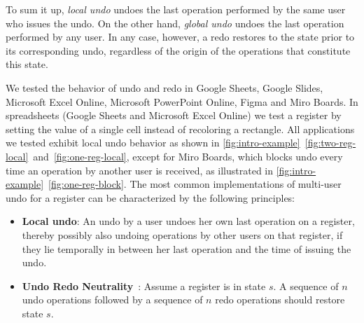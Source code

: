 \documentclass[sigplan,natbib=false,review]{acmart}
\begin{document}
To sum it up, \emph{local undo} undoes the last operation
performed by the same user who issues the undo.
On the other hand, \emph{global undo} undoes the last operation
performed by any user.
In any case, however, a redo restores to the state prior to its corresponding undo,
regardless of the origin of the operations that constitute this state.



We tested the behavior of undo and redo in Google Sheets, Google Slides,
Microsoft Excel Online, Microsoft PowerPoint Online, Figma and Miro Boards.
In spreadsheets (Google Sheets and Microsoft Excel Online)
we test a register by setting the value of a single cell instead of recoloring
a rectangle.
All applications we tested exhibit local undo behavior as shown in
\cref{fig:intro-example}~\ref{fig:two-reg-local}~and~\ref{fig:one-reg-local},
except for Miro Boards, which blocks undo every time an operation
by another user is received, as illustrated
in \cref{fig:intro-example}~\ref{fig:one-reg-block}.
The most common implementations of multi-user undo for a register
can be characterized by the following principles:

\begin{itemize}
  \item \textbf{Local undo}:
    An undo by a user undoes her own last operation on a register,
    thereby possibly also undoing operations by other users on that register,
    if they lie temporally in between her last operation and the time of
    issuing the undo.
  \item \textbf{Undo Redo Neutrality}~\cite{figma2019multiplayer}:
    Assume a register is in state $s$.
    A sequence of $n$ undo operations followed by a sequence of $n$ redo operations
    should restore state $s$.
\end{itemize}
\end{document}
